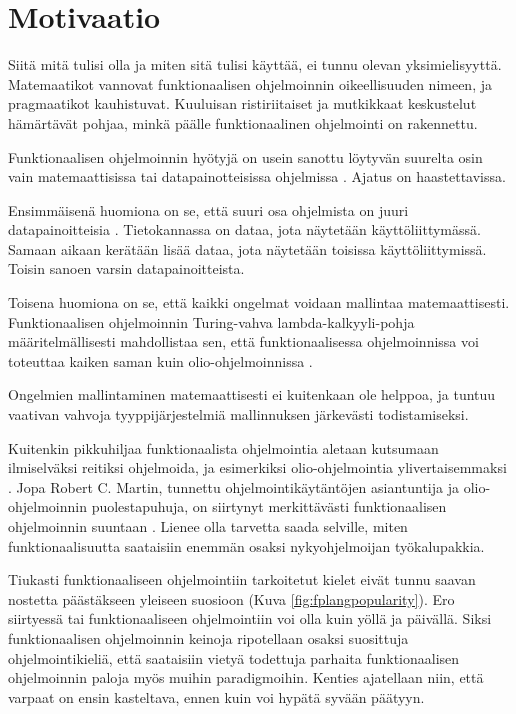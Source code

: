 
\chapter{Motivaatio}

Siitä mitä  tulisi olla ja miten sitä tulisi käyttää, ei tunnu olevan yksimielisyyttä. Matemaatikot vannovat funktionaalisen ohjelmoinnin oikeellisuuden nimeen, ja pragmaatikot kauhistuvat. Kuuluisan ristiriitaiset ja mutkikkaat keskustelut hämärtävät pohjaa, minkä päälle funktionaalinen ohjelmointi on rakennettu. \citep{stackoverflow_what_monad,stackoverflow:why_monad,promises-spec-94,dear_functional_bros}

Funktionaalisen ohjelmoinnin hyötyjä on usein sanottu löytyvän suurelta osin vain matemaattisissa tai datapainotteisissa ohjelmissa \cite[10]{cantarella_fp_haitat}. Ajatus on haastettavissa.

Ensimmäisenä huomiona on se, että suuri osa ohjelmista on juuri datapainoitteisia \cite{gartnerb2b}. Tietokannassa on dataa, jota näytetään käyttöliittymässä. Samaan aikaan kerätään lisää dataa, jota näytetään toisissa käyttöliittymissä. Toisin sanoen varsin datapainoitteista.

Toisena huomiona on se, että kaikki ongelmat voidaan mallintaa matemaattisesti. Funktionaalisen ohjelmoinnin Turing-vahva lambda-kalkyyli-pohja määritelmällisesti mahdollistaa sen, että funktionaalisessa ohjelmoinnissa voi toteuttaa kaiken saman kuin olio-ohjelmoinnissa \cite{Tan2004,computerphile_lambda}.

Ongelmien mallintaminen matemaattisesti ei kuitenkaan ole helppoa, ja tuntuu vaativan vahvoja tyyppijärjestelmiä mallinnuksen järkevästi todistamiseksi.

Kuitenkin pikkuhiljaa funktionaalista ohjelmointia aletaan kutsumaan ilmiselväksi reitiksi ohjelmoida, ja esimerkiksi olio-ohjelmointia ylivertaisemmaksi \cite[1]{the_oo_way}. Jopa Robert C. Martin, tunnettu ohjelmointikäytäntöjen asiantuntija ja olio-ohjelmoinnin puolestapuhuja, on siirtynyt merkittävästi funktionaalisen ohjelmoinnin suuntaan \cite{martin2019whyclojure,martin2017pragmaticfp}. Lienee olla tarvetta saada selville, miten funktionaalisuutta saataisiin enemmän osaksi nykyohjelmoijan työkalupakkia.

Tiukasti funktionaaliseen ohjelmointiin tarkoitetut kielet eivät tunnu saavan nostetta päästäkseen yleiseen suosioon (Kuva \ref{fig:fplangpopularity}). Ero siirtyessä  tai  funktionaaliseen ohjelmointiin voi olla kuin yöllä ja päivällä. Siksi funktionaalisen ohjelmoinnin keinoja ripotellaan osaksi suosittuja ohjelmointikieliä, että saataisiin vietyä todettuja parhaita funktionaalisen ohjelmoinnin paloja myös muihin paradigmoihin. Kenties ajatellaan niin, että varpaat on ensin kasteltava, ennen kuin voi hypätä syvään päätyyn.

